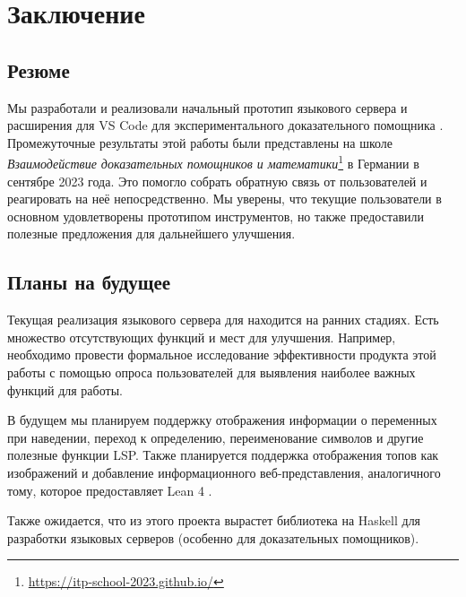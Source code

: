 \chapter{Заключение}
\label{chap:conclusion}

\section{Резюме}

Мы разработали и реализовали начальный прототип языкового сервера и расширения для VS Code для экспериментального доказательного помощника \Rzk{}. Промежуточные результаты этой работы были представлены на школе \textit{Взаимодействие доказательных помощников и математики}\footnote{\url{https://itp-school-2023.github.io/}} в Германии в сентябре 2023 года. Это помогло собрать обратную связь от пользователей и реагировать на неё непосредственно. Мы уверены, что текущие пользователи в основном удовлетворены прототипом инструментов, но также предоставили полезные предложения для дальнейшего улучшения.

\section{Планы на будущее}

Текущая реализация языкового сервера для \Rzk{} находится на ранних стадиях. Есть множество отсутствующих функций и мест для улучшения. Например, необходимо провести формальное исследование эффективности продукта этой работы с помощью опроса пользователей для выявления наиболее важных функций для работы.

В будущем мы планируем поддержку отображения информации о переменных при наведении, переход к определению, переименование символов и другие полезные функции LSP. Также планируется поддержка отображения топов как изображений и добавление информационного веб-представления, аналогичного тому, которое предоставляет Lean 4 \cite{Nawrocki2023}.

Также ожидается, что из этого проекта вырастет библиотека на Haskell для разработки языковых серверов (особенно для доказательных помощников).
